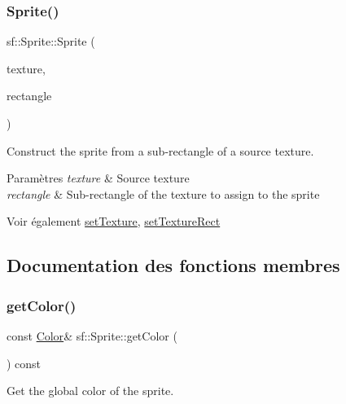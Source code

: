 \subsubsection{\texorpdfstring{Sprite()}{Sprite()}\hspace{0.1cm}{\footnotesize\ttfamily [3/3]}}
{\footnotesize\ttfamily sf\+::\+Sprite\+::\+Sprite (\begin{DoxyParamCaption}\item[{const \hyperlink{classsf_1_1Texture}{Texture} \&}]{texture,  }\item[{const \hyperlink{classsf_1_1Rect}{Int\+Rect} \&}]{rectangle }\end{DoxyParamCaption})}



Construct the sprite from a sub-\/rectangle of a source texture. 


\begin{DoxyParams}{Paramètres}
{\em texture} & Source texture \\
\hline
{\em rectangle} & Sub-\/rectangle of the texture to assign to the sprite\\
\hline
\end{DoxyParams}
\begin{DoxySeeAlso}{Voir également}
\hyperlink{classsf_1_1Sprite_a3729c88d88ac38c19317c18e87242560}{set\+Texture}, \hyperlink{classsf_1_1Sprite_a3fefec419a4e6a90c0fd54c793d82ec2}{set\+Texture\+Rect} 
\end{DoxySeeAlso}


\subsection{Documentation des fonctions membres}
\mbox{\label{classsf_1_1Sprite_ac5f419f37b4e38f7a94186e3a3e303e1}} 
\subsubsection{\texorpdfstring{get\+Color()}{getColor()}}
{\footnotesize\ttfamily const \hyperlink{classsf_1_1Color}{Color}\& sf\+::\+Sprite\+::get\+Color (\begin{DoxyParamCaption}{ }\end{DoxyParamCaption}) const}



Get the global color of the sprite. 

